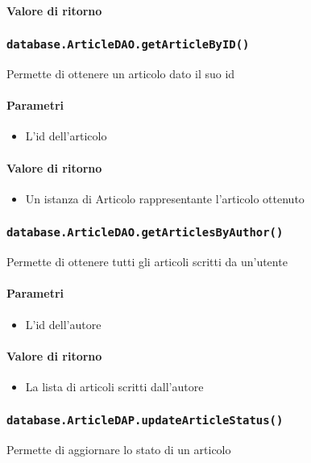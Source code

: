 \paragraph{Valore di ritorno}

\subsubsection{\texttt{database.ArticleDAO.getArticleByID()}}
Permette di ottenere un articolo dato il suo id
\paragraph{Parametri}
\begin{itemize}
\item L'id dell'articolo
\end{itemize}
\paragraph{Valore di ritorno}
\begin{itemize}
\item Un istanza di Articolo rappresentante l'articolo ottenuto
\end{itemize}

\subsubsection{\texttt{database.ArticleDAO.getArticlesByAuthor()}}
Permette di ottenere tutti gli articoli scritti da un'utente
\paragraph{Parametri}
\begin{itemize}
\item L'id dell'autore
\end{itemize}
\paragraph{Valore di ritorno}
\begin{itemize}
\item La lista di articoli scritti dall'autore
\end{itemize}

\subsubsection{\texttt{database.ArticleDAP.updateArticleStatus()}}
Permette di aggiornare lo stato di un articolo
